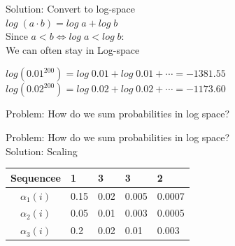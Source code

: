 \begin{frame}
\center
Solution: Convert to log-space\\
$log \; (a \cdot b) = log \; a + log \; b$\\
\vspace{20pt}
Since $a < b \iff log \; a < log \; b$:\\
\vspace{20pt} 
We can often stay in Log-space
\end{frame}

\begin{frame}
\center
$log (0.01^{200}) = log \; 0.01 + log \; 0.01 + \cdots = -1381.55$\\
\vspace{20pt}
$log (0.02^{200}) = log \; 0.02 + log \; 0.02 + \cdots = -1173.60$
\end{frame}

\begin{frame}
\center
Problem: How do we sum probabilities in log space?
\end{frame}

\begin{frame}
\center
Problem: How do we sum probabilities in log space?\\
\vspace{20pt}
Solution: Scaling
\end{frame}

\begin{frame}
\begin{table}[h]
\begin{tabular}{|c|l|l|l|l|}
 \hline
Sequencee      & 1     & 3    & 3     & 2      \\ \hline
$\alpha_1(i)$          & 0.15  & 0.02 & 0.005 & 0.0007 \\ \hline
$\alpha_2(i)$          & 0.05  & 0.01 & 0.003 & 0.0005 \\ \hline
$\alpha_3(i)$          & 0.2   & 0.02 & 0.01  & 0.003  \\ \hline
\end{tabular}
\end{table}
\end{frame}

